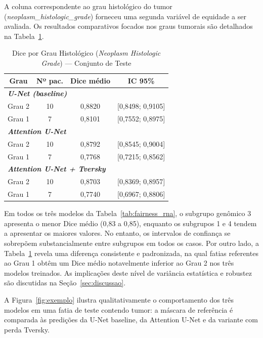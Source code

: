 \documentclass[conference]{IEEEtran}
\begin{document}
A coluna correspondente ao grau histológico do tumor (\textit{neoplasm\_histologic\_grade}) forneceu uma segunda variável de equidade a ser avaliada. Os resultados comparativos focados nos graus tumorais são detalhados na Tabela~\ref{tab:fairness_grade}.

\begin{table}[ht!]
\centering
\footnotesize
\setlength{\tabcolsep}{4pt}
\caption{Dice por Grau Histológico (\textit{Neoplasm Histologic Grade}) --- Conjunto de Teste}
\label{tab:fairness_grade}
\begin{tabular}{c c c c}
\hline
\textbf{Grau} & \textbf{Nº pac.} & \textbf{Dice médio} & \textbf{IC 95\%} \\
\hline
\multicolumn{4}{l}{\textit{\textbf{U-Net (baseline)}}} \\
Grau 2 & 10 & 0,8820 & [0,8498; 0,9105] \\
Grau 1 & 7  & 0,8101 & [0,7552; 0,8975] \\
\hline
\multicolumn{4}{l}{\textit{\textbf{Attention U-Net}}} \\
Grau 2 & 10 & 0,8792 & [0,8545; 0,9004] \\
Grau 1 & 7  & 0,7768 & [0,7215; 0,8562] \\
\hline
\multicolumn{4}{l}{\textit{\textbf{Attention U-Net + Tversky}}} \\
Grau 2 & 10 & 0,8703 & [0,8369; 0,8957] \\
Grau 1 & 7  & 0,7740 & [0,6967; 0,8806] \\
\hline
\end{tabular}
\end{table}

Em todos os três modelos da Tabela~\ref{tab:fairness_rna}, o subgrupo genômico 3 apresenta o menor Dice médio (0,83 a 0,85), enquanto os subgrupos 1 e 4 tendem a apresentar os maiores valores. No entanto, os intervalos de confiança se sobrepõem substancialmente entre subgrupos em todos os casos. Por outro lado, a Tabela~\ref{tab:fairness_grade} revela uma diferença consistente e padronizada, na qual fatias referentes ao Grau 1 obtêm um Dice médio notavelmente inferior ao Grau 2 nos três modelos treinados. As implicações deste nível de variância estatística e robustez são discutidas na Seção~\ref{sec:discussao}.

A Figura~\ref{fig:exemplo} ilustra qualitativamente o comportamento dos três modelos em uma fatia de teste contendo tumor: a máscara de referência é comparada às predições da U-Net baseline, da Attention U-Net e da variante com perda Tversky.
\end{document}

